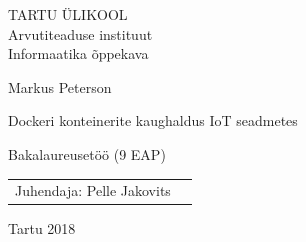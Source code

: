 \documentclass[12pt]{article}
\begin{document}
  
  \thispagestyle{empty}
  \begin{center}
  
  \large
  TARTU ÜLIKOOL\\
  Arvutiteaduse instituut\\
  Informaatika õppekava\\%
  
  \vspace{25mm}
  
  \Large Markus Peterson
  
  \vspace{4mm}
  
  \huge Dockeri konteinerite kaughaldus IoT seadmetes
  
  \vspace{20mm}
  
  \Large Bakalaureusetöö (9 EAP)
  
  \end{center}
  
  \vspace{2mm}
  
  \begin{flushright}
   {
   \setlength{\extrarowheight}{5pt}
   \begin{tabular}{r l} 
    Juhendaja: Pelle Jakovits
   \end{tabular}
   }
  \end{flushright}
  
  
  \vfill
  \centerline{Tartu 2018}
  
  
  
  
  \newpage
  
\end{document}
